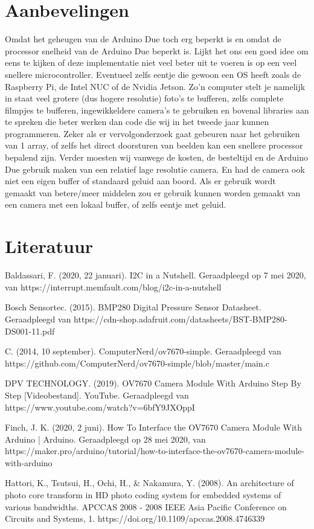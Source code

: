 \documentclass{article}
\begin{document}
\section{Aanbevelingen}
Omdat het geheugen van de Arduino Due toch erg beperkt is en omdat de processor snelheid van de Arduino Due beperkt is. Lijkt het ons een goed idee om eens te kijken of deze implementatie niet veel beter uit te voeren is op een veel snellere microcontroller. Eventueel zelfs eentje die gewoon een OS heeft zoals de Raspberry Pi, de Intel NUC of de Nvidia Jetson. Zo’n computer stelt je namelijk in staat veel grotere (dus hogere resolutie) foto’s te bufferen, zelfs complete filmpjes te bufferen, ingewikkeldere camera’s te gebruiken en bovenal libraries aan te spreken die beter werken dan code die wij in het tweede jaar kunnen programmeren. Zeker als er vervolgonderzoek gaat gebeuren naar het gebruiken van 1 array, of zelfs het direct doorsturen van beelden kan een snellere processor bepalend zijn.
Verder moesten wij vanwege de kosten, de besteltijd en de Arduino Due gebruik maken van een relatief lage resolutie camera. En had de camera ook niet een eigen buffer of standaard geluid aan boord. Als er gebruik wordt gemaakt van betere/meer middelen zou er gebruik kunnen worden gemaakt van een camera met een lokaal buffer, of zelfs eentje met geluid. 

\section{Literatuur}
Baldassari, F. (2020, 22 januari). I2C in a Nutshell. Geraadpleegd op 7 mei 2020, van https://interrupt.memfault.com/blog/i2c-in-a-nutshell

Bosch Sensortec. (2015). BMP280 Digital Pressure Sensor Datasheet. Geraadpleegd van https://cdn-shop.adafruit.com/datasheets/BST-BMP280-DS001-11.pdf

C. (2014, 10 september). ComputerNerd/ov7670-simple. Geraadpleegd van https://github.com/ComputerNerd/ov7670-simple/blob/master/main.c

DPV TECHNOLOGY. (2019). OV7670 Camera Module With Arduino Step By Step [Videobestand]. YouTube. Geraadpleegd van https://www.youtube.com/watch?v=6bfY9JXOppI

Finch, J. K. (2020, 2 juni). How To Interface the OV7670 Camera Module With Arduino | Arduino. Geraadpleegd op 28 mei 2020, van https://maker.pro/arduino/tutorial/how-to-interface-the-ov7670-camera-module-with-arduino

Hattori, K., Tsutsui, H., Ochi, H., & Nakamura, Y. (2008). An architecture of photo core transform in HD photo coding system for embedded systems of various bandwidths. APCCAS 2008 - 2008 IEEE Asia Pacific Conference on Circuits and Systems, 1. https://doi.org/10.1109/apccas.2008.4746339
\end{document}

